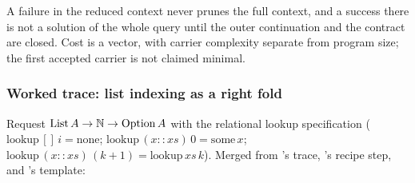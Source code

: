 A failure in the reduced context never prunes the full context, and a success there is not a solution of the whole query until the outer continuation and the contract are closed. Cost is a vector, with carrier complexity separate from program size; the first accepted carrier is not claimed minimal.

\subsubsection{Worked trace: list indexing as a right fold}

Request $\mathrm{List}\,A \to \mathbb{N} \to \mathrm{Option}\,A$ with the relational lookup specification ($\mathrm{lookup}\,[]\,i = \mathrm{none}$; $\mathrm{lookup}\,(x :: xs)\,0 = \mathrm{some}\,x$; $\mathrm{lookup}\,(x :: xs)\,(k+1) = \mathrm{lookup}\,xs\,k$). Merged from 's trace, 's recipe step, and 's template:


